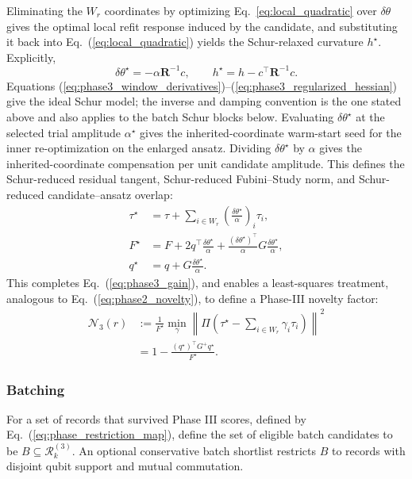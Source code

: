 \documentclass[
  reprint,
  amsmath,
  amssymb,
  aps,
  pra,
  nofootinbib,
  superscriptaddress,
  floatfix
]{revtex4-2}
\begin{document}
Eliminating the \(W_r\) coordinates by optimizing Eq.~\ref{eq:local_quadratic} over $\delta\theta$ gives the optimal local refit response induced by the candidate, and substituting it back into Eq.~(\ref{eq:local_quadratic}) yields the Schur-relaxed curvature $h^\star$. Explicitly,
\begin{equation}
\delta\theta^\star=-\alpha\mathbf R^{-1}c,
\qquad
h^\star=h-c^{\top}\mathbf R^{-1}c .
\label{eq:phase3_schur_response}
\end{equation}
Equations (\ref{eq:phase3_window_derivatives})–(\ref{eq:phase3_regularized_hessian}) give the ideal Schur model; the inverse and damping convention is the one stated above
and also applies to the batch Schur blocks below. Evaluating $\delta\theta^\star$ at the selected trial amplitude $\alpha^\star$ gives the inherited-coordinate warm-start seed for the inner re-optimization on the enlarged ansatz. Dividing $\delta\theta^\star$ by $\alpha$ gives the inherited-coordinate compensation per unit candidate amplitude. This defines the Schur-reduced residual tangent, Schur-reduced Fubini--Study norm, and Schur-reduced candidate--ansatz overlap:
\begin{equation}
\begin{aligned}
\tau^\star
&=\tau+\sum_{i\in W_r}\left(\frac{\delta\theta^\star}{\alpha}\right)_i\tau_i,\\
F^\star
&=F+2q^{\top}\frac{\delta\theta^\star}{\alpha}
+\frac{(\delta\theta^\star)^{\top}}{\alpha}G\frac{\delta\theta^\star}{\alpha},\\
q^\star
&=q+G\frac{\delta\theta^\star}{\alpha}.
\end{aligned}
\label{eq:phase3_star_geometry}
\end{equation}
This completes Eq.~(\ref{eq:phase3_gain}), and enables a least-squares treatment, analogous to Eq.~(\ref{eq:phase2_novelty}), to define a Phase-III novelty factor:
\begin{equation}
\begin{aligned}
\mathcal N_3(r)
&:=
\frac{1}{F^\star}
\min_{\gamma}
\left\|
\Pi\left(\tau^\star-\sum_{i\in W_r}\gamma_i\tau_i\right)
\right\|^2 \\
&=
1-\frac{(q^\star)^{\top}G^+q^\star}
{F^\star}.
\end{aligned}
\label{eq:phase3_novelty}
\end{equation}

\subsubsection{Batching}
For a set of records that survived Phase III scores, defined by Eq.~(\ref{eq:phase_restriction_map}), define the set of eligible batch candidates to be $B\subseteq\mathcal R_k^{(3)}$.  An optional conservative batch shortlist restricts \(B\) to records with disjoint qubit support and mutual commutation.
\end{document}
